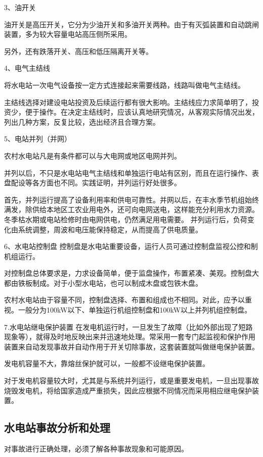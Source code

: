 \documentclass{ctexbook}
\begin{document}
3、油开关

油开关是高压开关，它分为少油开关和多油开关两种。由于有灭弧装置和自动跳闸装置，多为较大容量电站高压侧所采用。

另外，还有跌落开关、高压和低压隔离开关等。

4、电气主结线

将水电站一次电气设备按一定方式连接起来需要线路，线路叫做电气主结线。

主结线选择对建设电站投资及后续运行都有很大影响。主结线应力求简单明了，投资少，便于操作。在决定主结线时，应该认真地研究情况，从客观实际情况出发，列出几种方案，反复比较，选出经济且合理方案。

5、电站并列（并网）

农村水电站凡是有条件都可以与大电网或地区电网并列。

并列以后，不只是水电站电气主结线和单独运行电站有区别，而且在运行操作、表盘配设等各方面也不同。实践证明，并列运行好处很多。

首先，并列运行提高了设备利用率和供电可靠性。并网以后，在丰水季节机组始终满发，除供给本地区工农业用电外，还可向电网送电，这样能充分利用水力资源。冬季枯水期或电站检修时由电网供电，仍然满足用电需要。
并列运行后，负荷变化由系统调整，周波和电压能保持稳定，从而提高了供电质量。

6、水电站控制盘
控制盘是水电站重要设备，运行人员可通过控制盘监视公控和制机组运行。

对控制盘总体要求是，力求设备简单，便于监盘操作，布置紧凑、美观。控制盘大都由铁板制成。对于小型水电站，也可以制成木盘或包铁木盘。

农村水电站由于容量不同，控制盘选择、布置和组成也不相同。对此，应予以重视。一般分为100kW以下、单独运行机组控制盘和100kW以上并列机组控制盘。

7.水电站继电保护装置
在发电机运行时，一旦发生了故障（比如外部出现了短路现象等），就得及时地反映出来并迅速地处理。常采用一套专门起监视和保护作用装置来自动发现事故并自动作用于开关切除事故，这套装置就叫做继电保护装置。

发电机容量不大，靠熔丝保护就可以，一般都不设继电保护装置。

对于发电机容量较大时，尤其是与系统并列运行，或是重要发电机，一旦出现事故烧毁发电机，将给国家造成严重损失，因此应根据不同情况而采用相应继电保护装置。

\subsection{水电站事故分析和处理}
对事故进行正确处理，必须了解各种事故现象和可能原因。
\end{document}
